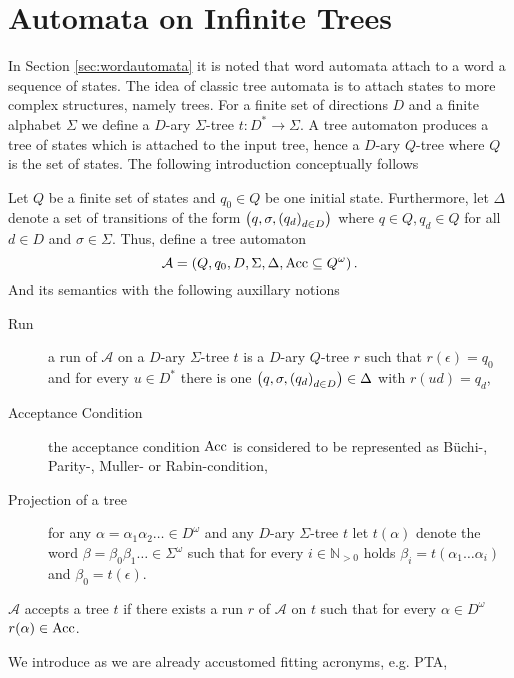 \section{Automata on Infinite Trees}
In Section \ref{sec:wordautomata} it is noted that word automata attach to a
word a sequence of states. The idea of classic tree automata is to attach
states to more complex structures, namely trees. For a finite set of
directions $D$ and a finite alphabet $\Sigma$ we define a $D$-ary $\Sigma$-tree
$t:D^{*}\rightarrow\Sigma$. A tree automaton produces a tree of states
which is attached to the input tree, hence a $D$-ary $Q$-tree where $Q$ is the
set of states. The following introduction conceptually follows 
\cite[Chapter 8]{AutoLogInfGames}
\begin{definition}
  Let $Q$ be a finite set of states and $q_{0}\in Q$ be one initial state.
  Furthermore, let $\Delta$ denote a set of transitions of the form
  $\left(q,\sigma, \left(q_{d}\right)_{d\in D}\right)$ where $q\in Q, q_{d}\in Q$ for
  all $d\in D$ and $\sigma\in\Sigma$. Thus, define a tree automaton
  \begin{equation*}
    \mathcal{A} = \left(Q, q_{0}, D, \Sigma, \Delta, \operatorname{Acc}\subseteq Q^{\omega}\right).
  \end{equation*}
  And its semantics with the following auxillary notions
  \begin{description}
    \item[Run] a run of $\mathcal{A}$ on a $D$-ary $\Sigma$-tree $t$ is a
      $D$-ary $Q$-tree $r$ such that $r(\epsilon) = q_{0}$ and for every 
      $u\in D^{*}$ there is one 
      $\left(q,\sigma, \left(q_{d}\right)_{d\in D}\right)\in\Delta$ with $r(ud) = q_{d}$,
    \item[Acceptance Condition] the acceptance condition $\operatorname{Acc}$ is considered
      to be represented as Büchi-, Parity-, Muller- or Rabin-condition,
    \item[Projection of a tree] for any $\alpha=\alpha_{1}\alpha_{2}\dots\in
      D^{\omega}$ and any $D$-ary $\Sigma$-tree $t$ let $t(\alpha)$ denote the 
      word $\beta = \beta_{0}\beta_{1}\dots\in\Sigma^{\omega}$ such that for 
      every $i\in\mathbb{N}_{>0}$ holds 
      $\beta_{i} = t(\alpha_{1}\dots\alpha_{i})$ and $\beta_{0} = t(\epsilon)$.
  \end{description}
  $\mathcal{A}$ accepts a tree $t$ if there exists a run $r$ of $\mathcal{A}$
  on $t$ such that for every $\alpha\in D^{\omega}$ $r(\alpha)\in\operatorname{Acc}$.
\end{definition}
We introduce as we are already accustomed fitting acronyms, e.g. \ac{PTA},
